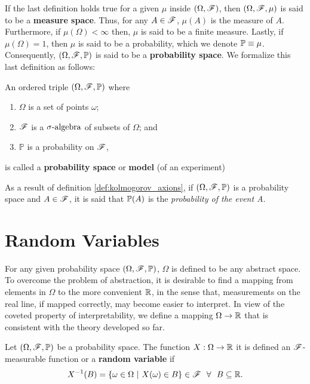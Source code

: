 \documentclass[../TGMAFFIRO.tex]{subfiles}
\begin{document}
If the last definition holds true for a given $\mu$ inside $(\Omega, \mathscr{F})$, then $(\Omega, \mathscr{F}, \mu)$ is said to be a \textbf{measure space}. Thus, for any $A\in\mathscr{F}$, $\mu(A)$ is the measure of $A$.\\

 Furthermore, if $\mu(\Omega) < \infty$ then, $\mu$ is said to be a finite measure. Lastly, if  $\mu(\Omega) = 1$, then $\mu$ is said to be a probability, which we denote $\mathbb{P} \equiv \mu$. Consequently, $(\Omega, \mathscr{F}, \mathbb{P})$ is said to be a \textbf{probability space}. We formalize this last definition as follows:

\begin{definition}\label{def:kolmogorov_axions}
	An ordered triple $(\Omega, \mathscr{F}, \mathbb{P})$ where
	\begin{enumerate}
		\item $\Omega$ is a set of points $\omega$;
		\item $\mathscr{F}$ is a $\sigma\text{-algebra}$ of subsets of $\Omega$; and
		\item $\mathbb P$ is a probability on $\mathscr{F}$,
	\end{enumerate}
	is called a \textbf{probability space} or \textbf{model} (of an experiment)
\end{definition}

As a result of definition \ref{def:kolmogorov_axions}, if $(\Omega, \mathscr{F}, \mathbb{P})$ is a probability space and $A \in \mathscr{F}$, it is said that $\mathbb{P}(A)$ is the \textit{probability of the event A}.

\section{Random Variables}
For any given probability space $(\Omega, \mathscr{F}, \mathbb{P})$, $\Omega$ is defined to be any abstract space. To overcome the problem of abstraction, it is desirable to find a mapping from elements in $\Omega$ to the more convenient $\mathbb{R}$, in the sense that, measurements on the real line, if mapped correctly, may become easier to interpret. In view of the coveted property of interpretability, we define a mapping $\Omega\to\mathbb{R}$ that is consistent with the theory developed so far.

\begin{definition}\label{def:rvar}
	Let $(\Omega, \mathscr{F}, \mathbb{P})$ be a probability space. The function $X: \Omega \rightarrow \mathbb{R}$ it is defined an $\mathscr{F}$-measurable function or a \textbf{random variable} if
	\begin{equation}
		X^{-1}(B) = \{\omega \in \Omega \ | \ X(\omega) \in B\} \in \mathscr{F} \ \ \forall \ \ B \subseteq \mathbb{R}.
	\end{equation}
\end{definition}
\end{document}
